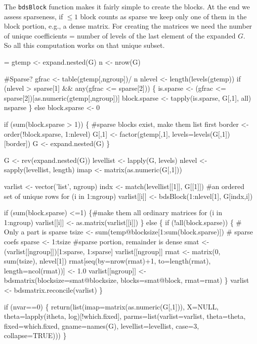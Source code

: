 \documentclass{article}
\begin{document}
The \Verb!bdsBlock! function makes it fairly simple to create the
blocks.  At the end we assess sparseness, if $\le1$ block counts as
sparse we keep only one of them in the block portion, e.g., a
dense matrix.  For creating the matrices we need the number of unique
coefficients = number of levels of the last element of the expanded $G$.
So all this computation works on that unique subset.
\begin{nwchunk}
=
 gtemp <- expand.nested(G)
 n <- nrow(G)
 
 #Sparse?
 gfrac <- table(gtemp[,ngroup])/ n
 nlevel <- length(levels(gtemp))
 if (nlevel > sparse[1] && any(gfrac <= sparse[2])) \{
         is.sparse <- (gfrac <= sparse[2])[as.numeric(gtemp[,ngroup])]
         block.sparse <- tapply(is.sparse, G[,1], all)
         nsparse
         \}
 else block.sparse <- 0
 
 if (sum(block.sparse > 1)) \{ #sparse blocks exist, make them list first
     border <- order(!block.sparse, 1:nlevel)
     G[,1] <- factor(gtemp[,1], levels=levels(G[,1])[border])
     G <- expand.nested(G)
     \}
 
 G <- rev(expand.nested(G))
 levellist <- lapply(G, levels)
 nlevel <-  sapply(levellist, length)
 imap <- matrix(as.numeric(G[,1]))
 
 varlist <- vector('list', ngroup)
 indx <- match(levellist[[1]], G[[1]])  #an ordered set of unique rows
 for (i in 1:ngroup) 
     varlist[[i]] <- bdsBlock(1:nlevel[1], G[indx,i])
 
 if (sum(block.sparse) <=1) \{#make them all ordinary matrices
     for (i in 1:ngroup) varlist[[i]] <- as.matrix(varlist[[i]])
     \}
 else \{
     if (!all(block.sparse)) \{ # Only a part is sparse
         tsize <- sum(temp@blocksize[1:sum(block.sparse)]) # sparse coefs
         sparse <- 1:tsize  #sparse portion, remainder is dense
         smat <- (varlist[[ngroup]])[1:sparse, 1:sparse]
         varlist[[ngroup]]
         rmat <- matrix(0, sum(tsize), nlevel[1])
         rmat[seq(by=nrow(rmat)+1, to=length(rmat), length=ncol(rmat))] <- 1.0
         varlist[[ngroup]] <- bdsmatrix(blocksize=smat@blocksize,
                                        blocks=smat@block, rmat=rmat)
         \} 
     varlist <- bdsmatrix.reconcile(varlist)
     \}
 
 if (nvar==0) \{
     return(list(imap=matrix(as.numeric(G[,1])), X=NULL, 
                 theta=lapply(itheta, log)[!which.fixed],
                 parms=list(varlist=varlist, theta=theta, 
                            fixed=which.fixed, gname=names(G),
                            levellist=levellist, case=3, collapse=TRUE)))
     \}
\end{nwchunk}
\end{document}
